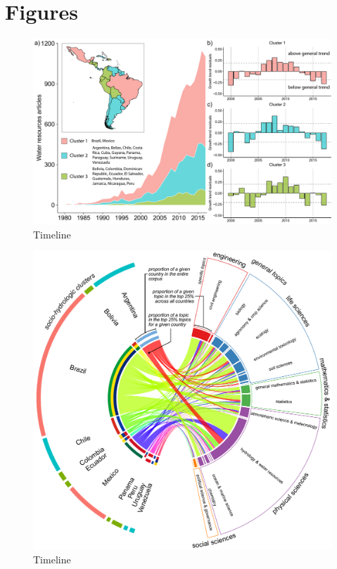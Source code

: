 \section{Figures}

\begin{figure}
\centering
\includegraphics[scale=0.3]{figures/timeline.pdf}
\caption{Timeline}
\label{fig:timeline}
\end{figure}


\begin{figure}
\centering
\includegraphics[scale=0.6]{figures/chord.pdf}
\caption{Timeline}
\label{fig:chord}
\end{figure}



